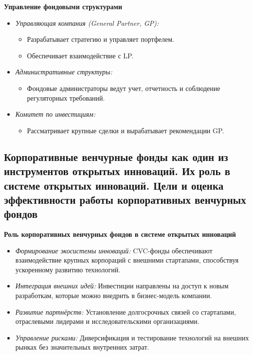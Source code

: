 \textbf{Управление фондовыми структурами}
\begin{itemize}
    \item \textit{Управляющая компания (General Partner, GP):}
    \begin{itemize}
        \item Разрабатывает стратегию и управляет портфелем.
        \item Обеспечивает взаимодействие с LP.
    \end{itemize}
    \item \textit{Административные структуры:}
    \begin{itemize}
        \item Фондовые администраторы ведут учет, отчетность и соблюдение регуляторных требований.
        \end{itemize}
    \item \textit{Комитет по инвестициям:}
    \begin{itemize}
        \item Рассматривает крупные сделки и вырабатывает рекомендации GP.
    \end{itemize}
\end{itemize}

\pagebreak
\subsection{Корпоративные венчурные фонды как один из инструментов открытых инноваций. Их роль в системе открытых инноваций. Цели и оценка эффективности работы корпоративных венчурных фондов}

\textbf{Роль корпоративных венчурных фондов в системе открытых инноваций}
\begin{itemize}
    \item \textit{Формирование экосистемы инноваций:} 
    CVC-фонды обеспечивают взаимодействие крупных корпораций с внешними стартапами, способствуя ускоренному развитию технологий.
    \item \textit{Интеграция внешних идей:} 
    Инвестиции направлены на доступ к новым разработкам, которые можно внедрить в бизнес-модель компании.
    \item \textit{Развитие партнёрств:} 
    Установление долгосрочных связей со стартапами, отраслевыми лидерами и исследовательскими организациями.
    \item \textit{Управление рисками:} 
    Диверсификация и тестирование технологий на внешних рынках без значительных внутренних затрат.
\end{itemize}

